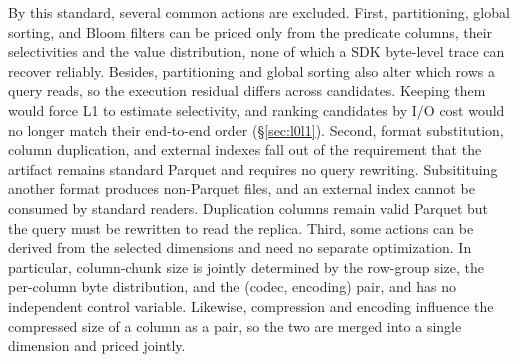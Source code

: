 By this standard, several common actions are excluded. 
First, partitioning, global sorting, and Bloom filters can be priced only from the predicate columns, their selectivities and the value distribution, none of which a SDK byte-level trace can recover reliably. 
Besides, partitioning and global sorting also alter which rows a query reads, so the execution residual differs across candidates. Keeping them would force L1 to estimate selectivity, and ranking candidates by I/O cost would no longer match their end-to-end order (\S\ref{sec:l0l1}).
Second, format substitution, column duplication, and
external indexes fall out of the requirement that the artifact remains standard Parquet and requires no query rewriting. Subsitituing another format produces non-Parquet files, and an external index cannot be consumed by standard readers. Duplication columns remain valid Parquet but the query must be rewritten to read the replica. Third, some actions can be derived from the selected dimensions and need no separate optimization. In particular, column-chunk size is jointly determined by the row-group size, the per-column byte distribution, and the (codec, encoding) pair, and has no independent control variable. Likewise, compression and encoding influence the compressed size of a column as a pair, so the two are merged into a single dimension and priced jointly.

